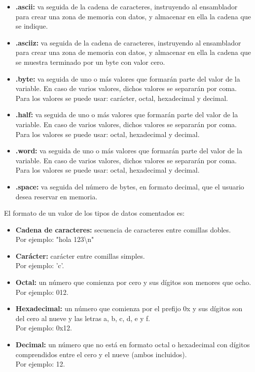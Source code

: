 \begin{itemize}
\item \textbf{.ascii:} va seguida de la cadena de caracteres, instruyendo al ensamblador para crear una zona de memoria con datos, y almacenar en ella la cadena que se indique.

\item \textbf{.asciiz:} va seguida de la cadena de caracteres, instruyendo al ensamblador para crear una zona de memoria con datos, y almacenar en ella la cadena que se muestra terminado por un byte con valor cero.

\item \textbf{.byte:} va seguida de uno o más valores que formarán parte del valor de la variable. En caso de varios valores, dichos valores se separarán por coma. Para los valores se puede usar: carácter, octal, hexadecimal y decimal.

\item \textbf{.half:} va seguida de uno o más valores que formarán parte del valor de la variable. En caso de varios valores, dichos valores se separarán por coma. Para los valores se puede usar: octal, hexadecimal y decimal.

\item \textbf{.word:} va seguida de uno o más valores que formarán parte del valor de la variable. En caso de varios valores, dichos valores se separarán por coma.
Para los valores se puede usar: octal, hexadecimal y decimal.

\item \textbf{.space:} va seguida del número de bytes, en formato decimal, que el usuario desea reservar en memoria.

\end{itemize}

El formato de un valor de los tipos de datos comentados es:

\begin{itemize}

\item \textbf{Cadena de caracteres:} secuencia de caracteres entre comillas dobles.\\
Por ejemplo: "hola 123\textbackslash n"

\item \textbf{Carácter:} carácter entre comillas simples.\\
Por ejemplo: 'c'.

\item \textbf{Octal:} un número que comienza por cero y sus dígitos son menores que ocho. \\
Por ejemplo: 012.

\item \textbf{Hexadecimal:} un número que comienza por el prefijo 0x y sus dígitos son del cero al nueve y las letras a, b, c, d, e y f.\\
Por ejemplo: 0x12.

\item \textbf{Decimal:} un número que no está en formato octal o hexadecimal con dígitos comprendidos entre el cero y el nueve (ambos incluidos).\\
Por ejemplo: 12.
\end{itemize}

